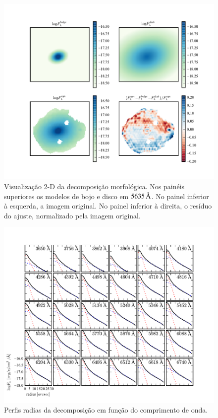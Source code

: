 \begin{figure}
	\includegraphics{figuras/decomp-model-images}
	\caption[Visualização 2-D da decomposição morfológica] {Visualização 2-D da
	decomposição morfológica. Nos painéis superiores os modelos de bojo e disco em
	$5635\,\text{\normalfont\AA}$. No painel inferior à esquerda, a imagem original. No painel
	inferior à direita, o resíduo do ajuste, normalizado pela imagem original.}
	\label{fig:decompImages}
\end{figure}

\begin{figure}
	\includegraphics{figuras/decomp-radial-profile}
	\caption[Perfis radias da decomposição em função do comprimento de onda]
	{Perfis radias da decomposição em função do comprimento de onda.}
	\label{fig:decompRadprof}
\end{figure}

